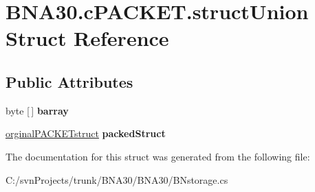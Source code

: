 \hypertarget{struct_b_n_a30_1_1c_p_a_c_k_e_t_1_1struct_union}{}\section{B\+N\+A30.\+c\+P\+A\+C\+K\+E\+T.\+struct\+Union Struct Reference}
\label{struct_b_n_a30_1_1c_p_a_c_k_e_t_1_1struct_union}
\subsection*{Public Attributes}
\begin{DoxyCompactItemize}
\item 
\mbox{\label{struct_b_n_a30_1_1c_p_a_c_k_e_t_1_1struct_union_a96bdac3831817e6e0c7eed821c5bc0b3}} 
byte \mbox{[}$\,$\mbox{]} {\bfseries barray}
\item 
\mbox{\label{struct_b_n_a30_1_1c_p_a_c_k_e_t_1_1struct_union_a85d9d533b5612312596918c616414201}} 
\mbox{\hyperlink{struct_b_n_a30_1_1c_p_a_c_k_e_t_1_1orginal_p_a_c_k_e_tstruct}{orginal\+P\+A\+C\+K\+E\+Tstruct}} {\bfseries packed\+Struct}
\end{DoxyCompactItemize}


The documentation for this struct was generated from the following file\+:\begin{DoxyCompactItemize}
\item 
C\+:/svn\+Projects/trunk/\+B\+N\+A30/\+B\+N\+A30/B\+Nstorage.\+cs\end{DoxyCompactItemize}
